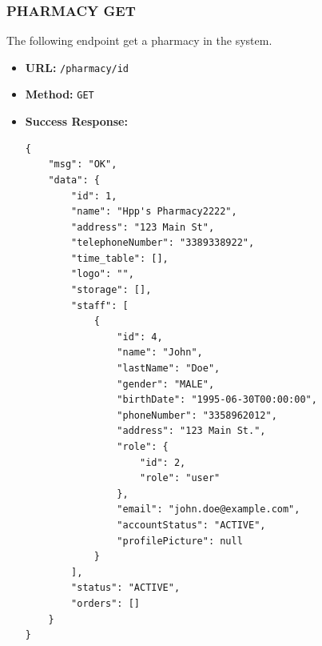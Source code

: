 \subsubsection*{PHARMACY GET}
The following endpoint get a pharmacy in the system.
\begin{itemize}
    \item \textbf{URL:}
    \newline \hspace*{1cm} \texttt{/pharmacy/id}  
    \item \textbf{Method:}
    \newline \hspace*{1cm}\texttt{GET}
\item \textbf{Success Response:}
\begin{lstlisting}[breaklines]
{
    "msg": "OK",
    "data": {
        "id": 1,
        "name": "Hpp's Pharmacy2222",
        "address": "123 Main St",
        "telephoneNumber": "3389338922",
        "time_table": [],
        "logo": "",
        "storage": [],
        "staff": [
            {
                "id": 4,
                "name": "John",
                "lastName": "Doe",
                "gender": "MALE",
                "birthDate": "1995-06-30T00:00:00",
                "phoneNumber": "3358962012",
                "address": "123 Main St.",
                "role": {
                    "id": 2,
                    "role": "user"
                },
                "email": "john.doe@example.com",
                "accountStatus": "ACTIVE",
                "profilePicture": null
            }
        ],
        "status": "ACTIVE",
        "orders": []
    }
}
\end{lstlisting}
\end{itemize}
